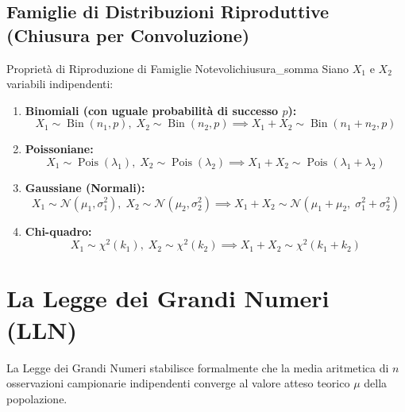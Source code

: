 \subsection{Famiglie di Distribuzioni Riproduttive (Chiusura per Convoluzione)}

\begin{proprieta}{Proprietà di Riproduzione di Famiglie Notevoli}{chiusura_somma}
Siano $X_1$ e $X_2$ variabili indipendenti:
\begin{enumerate}
    \item \textbf{Binomiali (con uguale probabilità di successo $p$):}
    \begin{equation}
        X_1 \sim \operatorname{Bin}(n_1, p), \; X_2 \sim \operatorname{Bin}(n_2, p) \implies X_1 + X_2 \sim \operatorname{Bin}(n_1 + n_2, p)
    \end{equation}
    \item \textbf{Poissoniane:}
    \begin{equation}
        X_1 \sim \operatorname{Pois}(\lambda_1), \; X_2 \sim \operatorname{Pois}(\lambda_2) \implies X_1 + X_2 \sim \operatorname{Pois}(\lambda_1 + \lambda_2)
    \end{equation}
    \item \textbf{Gaussiane (Normali):}
    \begin{equation}
        X_1 \sim \mathcal{N}(\mu_1, \sigma_1^2), \; X_2 \sim \mathcal{N}(\mu_2, \sigma_2^2) \implies X_1 + X_2 \sim \mathcal{N}(\mu_1 + \mu_2, \; \sigma_1^2 + \sigma_2^2)
    \end{equation}
    \item \textbf{Chi-quadro:}
    \begin{equation}
        X_1 \sim \chi^2(k_1), \; X_2 \sim \chi^2(k_2) \implies X_1 + X_2 \sim \chi^2(k_1 + k_2)
    \end{equation}
\end{enumerate}
\end{proprieta}

\section{La Legge dei Grandi Numeri (LLN)}
\label{sec:legge_grandi_numeri}

La Legge dei Grandi Numeri stabilisce formalmente che la media aritmetica di $n$ osservazioni campionarie indipendenti converge al valore atteso teorico $\mu$ della popolazione.

